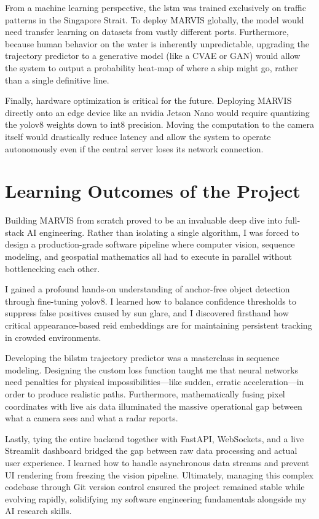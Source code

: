 From a machine learning perspective, the \gls{lstm} was trained exclusively on traffic patterns in the Singapore Strait. To deploy MARVIS globally, the model would need transfer learning on datasets from vastly different ports. Furthermore, because human behavior on the water is inherently unpredictable, upgrading the trajectory predictor to a generative model (like a CVAE or GAN) would allow the system to output a probability heat-map of where a ship might go, rather than a single definitive line.

Finally, hardware optimization is critical for the future. Deploying MARVIS directly onto an edge device like an \gls{nvidia} Jetson Nano would require quantizing the \gls{yolov8} weights down to \gls{int8} precision. Moving the computation to the camera itself would drastically reduce latency and allow the system to operate autonomously even if the central server loses its network connection.

\section{Learning Outcomes of the Project}

Building MARVIS from scratch proved to be an invaluable deep dive into full-stack AI engineering. Rather than isolating a single algorithm, I was forced to design a production-grade software pipeline where computer vision, sequence modeling, and geospatial mathematics all had to execute in parallel without bottlenecking each other. 

I gained a profound hands-on understanding of anchor-free object detection through fine-tuning \gls{yolov8}. I learned how to balance confidence thresholds to suppress false positives caused by sun glare, and I discovered firsthand how critical appearance-based \gls{reid} embeddings are for maintaining persistent tracking in crowded environments. 

Developing the \gls{bilstm} trajectory predictor was a masterclass in sequence modeling. Designing the custom loss function taught me that neural networks need penalties for physical impossibilities—like sudden, erratic acceleration—in order to produce realistic paths. Furthermore, mathematically fusing pixel coordinates with live \gls{ais} data illuminated the massive operational gap between what a camera sees and what a radar reports.

Lastly, tying the entire backend together with FastAPI, WebSockets, and a live Streamlit dashboard bridged the gap between raw data processing and actual user experience. I learned how to handle asynchronous data streams and prevent UI rendering from freezing the vision pipeline. Ultimately, managing this complex codebase through Git version control ensured the project remained stable while evolving rapidly, solidifying my software engineering fundamentals alongside my AI research skills.